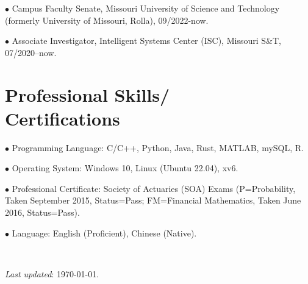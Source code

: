 \documentclass[margin,line]{res}
\begin{document}
\begin{resume}
$\bullet$ Campus Faculty Senate, Missouri University
of Science and Technology (formerly University of Missouri, Rolla), 09/2022-now.

$\bullet$ Associate Investigator, Intelligent Systems Center (ISC), Missouri S\&T, 07/2020--now. 


\section{\sc Professional Skills/ \\ Certifications}

$\bullet$ Programming Language: C/C++, Python, Java, Rust, MATLAB, mySQL, R. 

$\bullet$ Operating System: Windows 10, Linux (Ubuntu 
 22.04), xv6.

$\bullet$ Professional Certificate: Society of Actuaries (SOA) Exams
(P=Probability, Taken September 2015, Status=Pass; FM=Financial Mathematics, Taken
June 2016, Status=Pass).

$\bullet$ Language: English (Proficient), Chinese (Native).


\

\textit{Last updated}: \today.

\end{resume}
\end{document}
